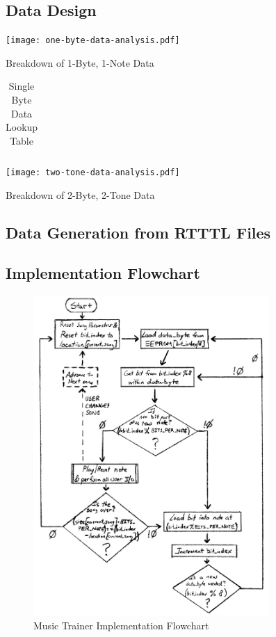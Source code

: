 \documentclass[11pt]{article}
\begin{document}
\subsection{Data Design}

\begin{center}
\texttt{[image: one-byte-data-analysis.pdf]}
\caption{Breakdown of 1-Byte, 1-Note Data}
\label{one-byte-data-breakdown}
\end{center}

\begin{table}
\centering
\caption{Single Byte Data Lookup Table}
\begin{tabular}{c c c}
\hline\hline
\end{tabular}
\label{data-lookup-table}
\end{table}

\begin{center}
\texttt{[image: two-tone-data-analysis.pdf]}
\caption{Breakdown of 2-Byte, 2-Tone Data}
\label{two-byte-data-breakdown}
\end{center}

\subsection{Data Generation from RTTTL Files}

\subsection{Implementation Flowchart}

\begin{figure}[h!]
\centering
\includegraphics[width=0.8\textwidth]{music-trainer-flowchart.pdf}
\caption{Music Trainer Implementation Flowchart}
\label{music-trainer-flowchart}
\end{figure}
\end{document}
